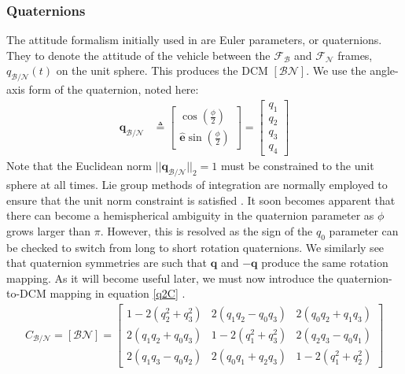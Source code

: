 \subsubsection{Quaternions}
The attitude formalism initially used in \cite{szmuk2017successive} are Euler parameters, or quaternions. They to denote the attitude of the vehicle between the $\mathcal{F}_\mathcal{B}$ and $\mathcal{F}_\mathcal{N}$ frames, $q_{\mathcal{B}/\mathcal{N}}(t)$ on the unit sphere. This produces the DCM $[\mathcal{B}\mathcal{N}]$. We use the angle-axis form of the quaternion, noted here:
% 
\begin{align}
	\bm{q}_{\mathcal{B}/\mathcal{N}} &\triangleq
	\begin{bmatrix}
	\cos(\frac{\phi}{2}) \\
	\hat{\bm{e}}\sin(\frac{\phi}{2})
	\end{bmatrix}
	= 
	\begin{bmatrix}
	q_1 \\ q_2 \\ q_3 \\ q_4
	\end{bmatrix}
\end{align}
%
Note that the Euclidean norm $\lvert \lvert {\bm{q}_{\mathcal{B}/\mathcal{N}}} \rvert \rvert_2 = 1$ must be constrained to the unit sphere at all times. Lie group methods of integration are normally employed to ensure that the unit norm constraint is satisfied \cite{andrle2013geometric}. It soon becomes apparent that there can become a hemispherical ambiguity in the quaternion parameter as $\phi$ grows larger than $\pi$. However, this is resolved as the sign of the $q_0$ parameter can be checked to switch from long to short rotation quaternions. We similarly see that quaternion symmetries are such that $\bm{q}$ and $-\bm{q}$ produce the same rotation mapping. As it will become useful later, we must now introduce the quaternion-to-DCM mapping in equation \ref{q2C} \cite{sj}.
% 
\begin{align}
\label{q2C}
C_{\mathcal{B}/\mathcal{N}} = [\mathcal{B}\mathcal{N}]={\begin{bmatrix}1-2(q_{2}^{2}+q_{3}^{2})&2(q_{1}q_{2}-q_{0}q_{3})&2(q_{0}q_{2}+q_{1}q_{3})\\2(q_{1}q_{2}+q_{0}q_{3})&1-2(q_{1}^{2}+q_{3}^{2})&2(q_{2}q_{3}-q_{0}q_{1})\\2(q_{1}q_{3}-q_{0}q_{2})&2(q_{0}q_{1}+q_{2}q_{3})&1-2(q_{1}^{2}+q_{2}^{2})\end{bmatrix}}
\end{align}
% 

